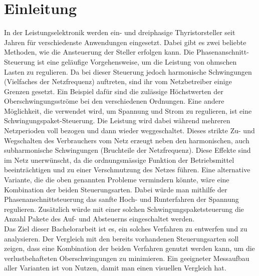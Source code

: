 \section{Einleitung}











In der Leistungselektronik werden ein- und dreiphasige Thyristorsteller seit Jahren für verschiedenste Anwendungen eingesetzt. Dabei gibt es zwei beliebte Methoden, wie die Ansteuerung der Steller erfolgen kann. Die Phasenanschnitt-Steuerung ist eine geläufige Vorgehensweise, um die Leistung von ohmschen Lasten zu regulieren. Da bei dieser Steuerung jedoch harmonische Schwingungen (Vielfaches der Netzfrequenz) auftreten, sind ihr vom Netzbetreiber einige Grenzen gesetzt. Ein Beispiel dafür sind die zulässige Höchstwerten der Oberschwingungsströme bei den verschiedenen Ordnungen. Eine andere Möglichkeit, die verwendet wird, um Spannung und Strom zu regulieren, ist eine Schwingungspaket-Steuerung. Die Leistung wird dabei während mehreren Netzperioden voll bezogen und dann wieder weggeschaltet. Dieses strikte Zu- und Wegschalten des Verbrauchers vom Netz erzeugt neben den harmonischen, auch subharmonische Schwingungen (Bruchteile der Netzfrequenz). Diese Effekte sind im Netz unerwünscht, da die ordnungsmässige Funktion der Betriebsmittel beeinträchtigen und zu einer Verschmutzung des Netzes führen.
Eine alternative Variante, die die oben genannten Probleme vermindern könnte, wäre eine Kombination der beiden Steuerungsarten. Dabei würde man mithilfe der Phasenanschnittsteuerung das sanfte Hoch- und Runterfahren der Spannung regulieren. Zusätzlich würde mit einer solchen Schwingungspaketsteuerung die Anzahl Pakete des Auf- und Absteuerns eingeschaltet werden.\\
Das Ziel dieser Bachelorarbeit ist es, ein solches Verfahren zu entwerfen und zu analysieren. Der Vergleich mit den bereits vorhandenen Steuerungsarten soll zeigen, dass eine Kombination der beiden Verfahren genutzt werden kann, um die verlustbehafteten Oberschwingungen zu minimieren. Ein geeigneter Messaufbau aller Varianten ist von Nutzen, damit man einen visuellen Vergleich hat.\\
